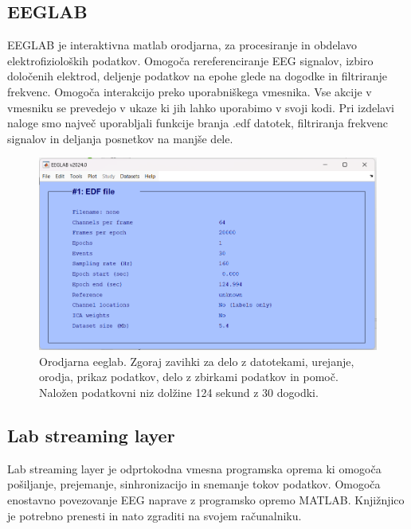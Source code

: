 \subsection{EEGLAB}
EEGLAB je interaktivna matlab orodjarna, za procesiranje in obdelavo elektrofizioloških podatkov. Omogoča rereferenciranje EEG signalov, izbiro določenih elektrod, deljenje podatkov na epohe glede na dogodke in filtriranje frekvenc. Omogoča interakcijo preko uporabniškega vmesnika. Vse akcije v vmesniku se prevedejo v ukaze ki jih lahko uporabimo v svoji kodi. Pri izdelavi naloge smo največ uporabljali funkcije branja .edf datotek, filtriranja frekvenc signalov in deljanja posnetkov na manjše dele.\cite{EEGLAB}
\begin{figure}[h!]
    \begin{center}
    \includegraphics[width=1\linewidth]{slike/EEGLAB.png}
    \end{center}
    \caption{Orodjarna eeglab. Zgoraj zavihki za delo z datotekami, urejanje, orodja, prikaz podatkov, delo z zbirkami podatkov in pomoč. Naložen podatkovni niz dolžine 124 sekund z 30 dogodki.}
    \end{figure}

\subsection{Lab streaming layer}
Lab streaming layer je odprtokodna vmesna programska oprema ki omogoča pošiljanje, prejemanje, sinhronizacijo in snemanje tokov podatkov. Omogoča enostavno povezovanje EEG naprave z programsko opremo MATLAB. Knjižnjico je potrebno prenesti in nato zgraditi na svojem računalniku.  \cite{Lslwebsite}

